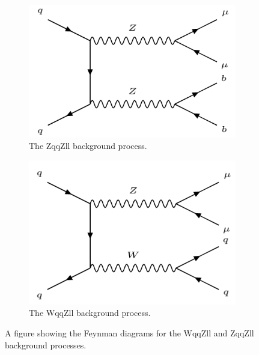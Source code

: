 \documentclass[12pt,a4paper,epsf,portrait,times,epsfig]{report}
\begin{document}
		
		\begin{figure}[h]
			\begin{subfigure}{.49\textwidth}
				\centering
				\includegraphics[scale=0.45]{ZqqZll}
				\caption{The ZqqZll background process.}
				\label{Fig:SFigZqqZllFeynman}
			\end{subfigure}
			\begin{subfigure}{.49\textwidth}
				\centering
				\includegraphics[scale=0.42]{WqqZll}
				\caption{The WqqZll background process.}
				\label{Fig:SFigWqqZllFeynman}
			\end{subfigure}
			\caption{A figure showing the Feynman diagrams for the WqqZll and ZqqZll background processes.}
			\label{Fig:DibosonBackgroundFeynman}
		\end{figure}  
		
\end{document}
